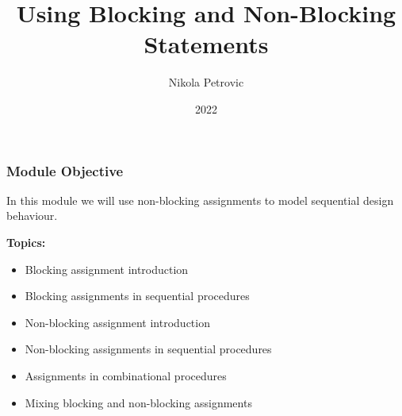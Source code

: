 \documentclass[t, notes, xcolor=table]{beamer}
\title{Using Blocking and Non-Blocking Statements}
\author{Nikola Petrovic}
\institute{University of Belgrade, School of Electrical Engineering}
\date{2022}
\begin{document}
\frame{\titlepage}

\begin{frame}
\frametitle{Module Objective}

In this module we will use non-blocking assignments to model sequential design behaviour.
\newline

\textbf{Topics:}
\begin{itemize}
\item Blocking assignment introduction
\item Blocking assignments in sequential procedures
\item Non-blocking assignment introduction
\item Non-blocking assignments in sequential procedures
\item Assignments in combinational procedures
\item Mixing blocking and non-blocking assignments
\end{itemize}

\end{frame}
\end{document}

